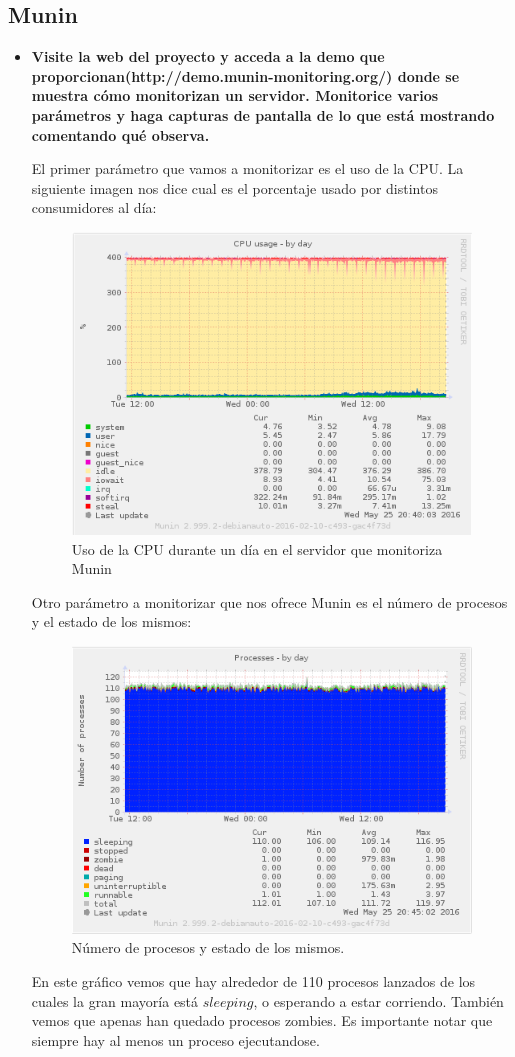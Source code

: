 \subsection{Munin}
\begin{itemize}
	\item \textbf{Visite la web del proyecto y acceda a la demo que proporcionan(http://demo.munin-monitoring.org/) donde se muestra cómo monitorizan un servidor. Monitorice varios parámetros y haga capturas de pantalla de lo que está mostrando comentando qué observa.}
	
	El primer parámetro que vamos a monitorizar es el uso de la CPU. La siguiente imagen nos dice cual es el porcentaje usado por distintos consumidores al día:\\
	
	\begin{figure}[H]
	\centering
	\includegraphics[width=0.7\linewidth]{monitoring_munin_cpu}
	\caption[CPUusage]{Uso de la CPU durante un día en el servidor que monitoriza Munin}
	\label{fig:monitoring_munin_cpu}
	\end{figure}
	
	Otro parámetro a monitorizar que nos ofrece Munin es el número de procesos y el estado de los mismos:\\
	
	\begin{figure}[H]
	\centering
	\includegraphics[width=0.7\linewidth]{monitorin_munin_procesos}
	\caption[ProcesosMunin]{Número de procesos y estado de los mismos.}
	\label{fig:monitorin_munin_procesos}
	\end{figure}
	
	En este gráfico vemos que hay alrededor de 110 procesos lanzados de los cuales la gran mayoría está $sleeping$, o esperando a estar corriendo. También vemos que apenas han quedado procesos zombies. Es importante notar que siempre hay al menos un proceso ejecutandose.
	
\end{itemize}
